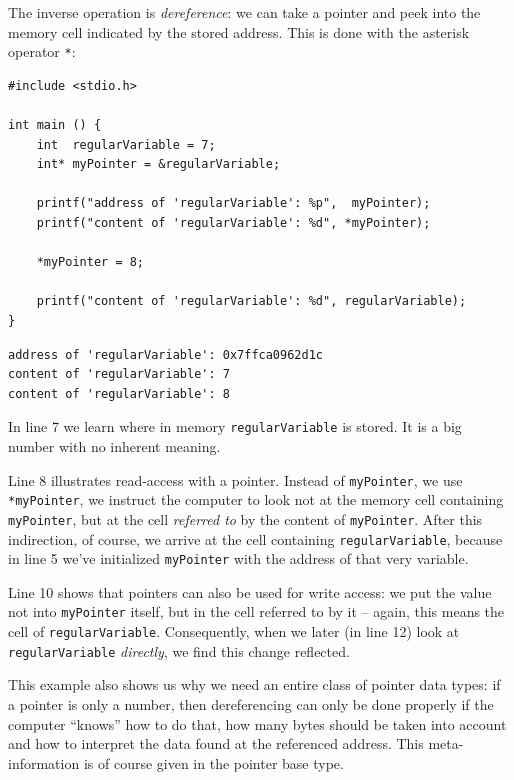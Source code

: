 {{{{The inverse operation is \emph{dereference}: we can take a pointer and peek into the memory cell indicated by the stored address. This is done with the asterisk operator \texttt{*}:

\begin{codebox}[dereferenceOperator.c]
\begin{verbatim}
#include <stdio.h>

int main () {
    int  regularVariable = 7;
    int* myPointer = &regularVariable;
    
    printf("address of 'regularVariable': %p",  myPointer);
    printf("content of 'regularVariable': %d", *myPointer);
    
    *myPointer = 8;
    
    printf("content of 'regularVariable': %d", regularVariable);
}
\end{verbatim}
 \label{code:dereference}
\end{codebox}

\begin{cmdbox}
\begin{verbatim}
address of 'regularVariable': 0x7ffca0962d1c
content of 'regularVariable': 7
content of 'regularVariable': 8
\end{verbatim}
\end{cmdbox}

In line 7 we learn where in memory \texttt{regularVariable} is stored. It is a big number with no inherent meaning.

Line 8 illustrates read-access with a pointer. Instead of \texttt{myPointer}, we use \texttt{*myPointer}, \ie we instruct the computer to look not at the memory cell containing \texttt{myPointer}, but at the cell \emph{referred to} by the content of \texttt{myPointer}. After this indirection, of course, we arrive at the cell containing \texttt{regularVariable}, because in line 5 we've initialized \texttt{myPointer} with the address of that very variable.

Line 10 shows that pointers can also be used for write access: we put the value  not into \texttt{myPointer} itself, but in the cell referred to by it -- again, this means the cell of \texttt{regularVariable}. Consequently, when we later (in line 12) look at \texttt{regularVariable} \emph{directly}, we find this change reflected.

This example also shows us why we need an entire class of pointer data types: if a pointer is only a number, then dereferencing can only be done properly if the computer \enquote{knows} how to do that, \ie how many bytes should be taken into account and how to interpret the data found at the referenced address. This meta-information is of course given in the pointer base type.

}}}}
